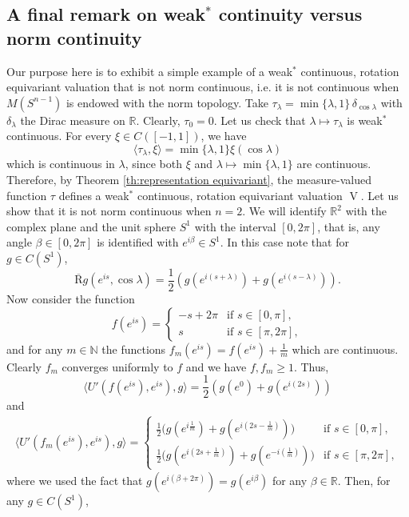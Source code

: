 \documentclass[11pt, a4paper]{amsart}
\newcommand{\sn}{{S^{n-1}}}
\newcommand{\oV}{\operatorname{V}}
\newcommand{\R}{\mathbb R}
\newcommand{\radon}{\operatorname{\overline R}}
\newcommand{\rhot}{\tau}
\newcommand{\G}{\xi}
\begin{document}
\subsection{A final remark on weak$^*$ continuity versus norm continuity} 
Our purpose here is to exhibit a simple example of a weak$^*$ continuous, rotation equivariant valuation that is not norm continuous, i.e. it is not continuous when $M(\sn)$ is endowed with the norm topology. Take $\rhot_\lambda=\min\{\lambda,1\}\,\delta_{\cos\lambda}$ with  $\delta_\lambda$ the Dirac measure on $\R$. Clearly, $\rhot_0=0$. Let us check that $\lambda\mapsto\rhot_\lambda$ is weak$^*$ continuous. For every $\G\in C([-1,1])$, we have
\[
    \langle \rhot_\lambda,\G\rangle=\min\{\lambda,1\} \G(\cos\lambda)
\]
which is continuous in $\lambda$, since both $\G$ and $\lambda\mapsto\min\{\lambda,1\}$ are continuous. Therefore, by Theorem \ref{th:representation equivariant}, the measure-valued function $\rhot$ defines a weak$^*$ continuous, rotation equivariant valuation $\oV$. Let us show that it is not norm continuous when $n=2$. We will identify $\mathbb{R}^2$ with the complex plane and the unit sphere $S^1$ with the interval $[0,2\pi]$, that is, any angle $\beta\in[0,2\pi]$ is identified with $e^{i\beta}\in S^1$. In this case note that for $g\in C(S^1)$,
\[ \radon g(e^{is}, \cos\lambda)
        =\frac{1}{2}\left(g(e^{i(s+\lambda) })  +g(e^{i(s-\lambda)})\right).
\]
Now consider the function
\[
    f(e^{is})=\left\{\begin{array}{ll}
        -s+2\pi & \text{if }s\in[0,\pi], \\
         s & \text{if }s\in[\pi,2\pi],
    \end{array}  \right.
\]
and for any $m\in\mathbb{N}$ the functions $f_m(e^{is})=f(e^{is})+\frac{1}{m}$ which are continuous. Clearly $f_m$ converges uniformly to $f$ and we have $f,f_m\geq 1$. Thus,
\[
    \langle U'(f(e^{is}),e^{is}),g\rangle
   =\frac{1}{2}\left(g(e^{0})+g(e^{i(2s)})\right)
\]
and 
\begin{align*}
    \langle U'(f_m(e^{is}),e^{is}),g\rangle 
  = \left\{\begin{array}{ll}
       \frac{1}{2}\big(g(e^{i\frac{1}{m}})+g(e^{i\left(2s-\frac{1}{m}\right)}) \big)  &  \text{if }s\in[0,\pi],\\[4pt]
       \frac{1}{2}\big(g(e^{i(2s+\frac{1}{m})})+g(e^{-i\left(\frac{1}{m}\right)}) \big)  & \text{if }s\in[\pi,2\pi],
    \end{array}  \right.
\end{align*}
where we used the fact that $g(e^{i(\beta+2\pi)})=g(e^{i\beta})$ for any $\beta\in\mathbb{R}$. Then, for any $g\in C(S^1)$,
\end{document}
